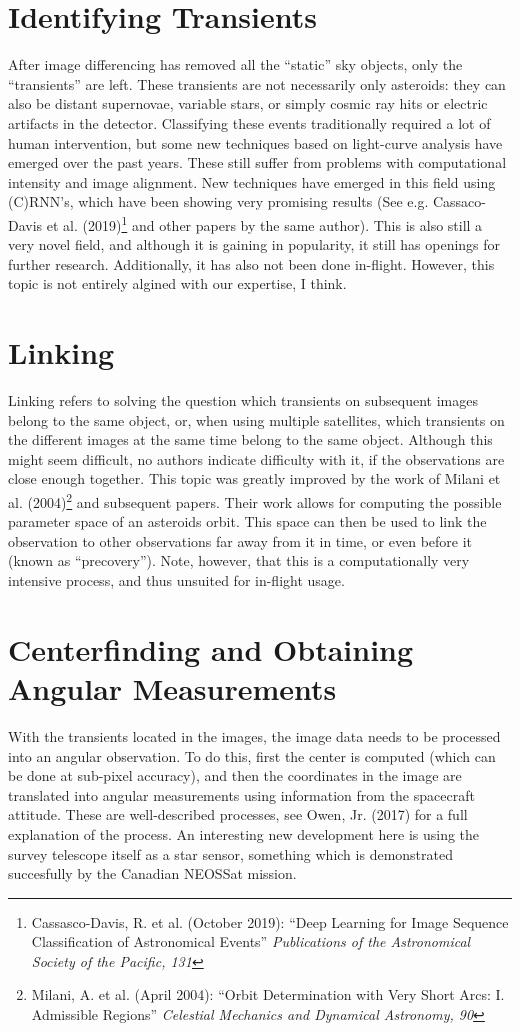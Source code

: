 \documentclass[a4paper,10pt]{article}
\begin{document}
\section{Identifying Transients}
After image differencing has removed all the ``static'' sky objects, only the ``transients'' are left. These transients are not necessarily only asteroids: they can also be distant supernovae, variable stars, or simply cosmic ray hits or electric artifacts in the detector. Classifying these events traditionally required a lot of human intervention, but some new techniques based on light-curve analysis have emerged over the past years. These still suffer from problems with computational intensity and image alignment. New techniques have emerged in this field using (C)RNN's, which have been showing very promising results (See e.g. Cassaco-Davis et al. (2019)\footnote{Cassasco-Davis, R. et al. (October 2019): ``Deep Learning for Image Sequence Classification of Astronomical Events'' \textit{Publications of the Astronomical Society of the Pacific, 131}} and other papers by the same author). This is also still a very novel field, and although it is gaining in popularity, it still has openings for further research. Additionally, it has also not been done in-flight. However, this topic is not entirely algined with our expertise, I think.

\section{Linking}
Linking refers to solving the question which transients on subsequent images belong to the same object, or, when using multiple satellites, which transients on the different images at the same time belong to the same object. Although this might seem difficult, no authors indicate difficulty with it, if the observations are close enough together. This topic was greatly improved by the work of Milani et al. (2004)\footnote{Milani, A. et al. (April 2004): ``Orbit Determination with Very Short Arcs: I. Admissible Regions'' \textit{Celestial Mechanics and Dynamical Astronomy, 90}} and subsequent papers. Their work allows for computing the possible parameter space of an asteroids orbit. This space can then be used to link the observation to other observations far away from it in time, or even before it (known as ``precovery''). Note, however, that this is a computationally very intensive process, and thus unsuited for in-flight usage.

\section{Centerfinding and Obtaining Angular Measurements}
With the transients located in the images, the image data needs to be processed into an angular observation. To do this, first the center is computed (which can be done at sub-pixel accuracy), and then the coordinates in the image are translated into angular measurements using information from the spacecraft attitude. These are well-described processes, see Owen, Jr. (2017) for a full explanation of the process. An interesting new development here is using the survey telescope itself as a star sensor, something which is demonstrated succesfully by the Canadian NEOSSat mission.
\end{document}
